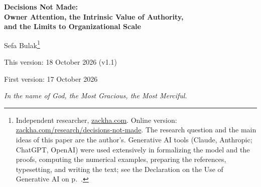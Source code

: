 \documentclass[11pt,a4paper]{article}
\theoremstyle{plain}
\begin{document}
\thispagestyle{plain}
\renewcommand{\thefootnote}{\fnsymbol{footnote}}
\begin{center}
  {\LARGE\bfseries Decisions Not Made:\\[0.35em]
    Owner Attention, the Intrinsic Value of Authority,\\[0.35em]
    and the Limits to Organizational Scale\par}
  \vspace{1.6em}
  {\large Sefa Bulak\footnote[1]{Independent researcher, \href{https://zackha.com}{zackha.com}. Online version: \href{https://zackha.com/research/decisions-not-made}{zackha.com/research/decisions-not-made}. The research question and the main ideas of this paper are the author's. Generative AI tools (Claude, Anthropic; ChatGPT, OpenAI) were used extensively in formalizing the model and the proofs, computing the numerical examples, preparing the references, typesetting, and writing the text; see the Declaration on the Use of Generative AI on p.~\pageref{sec:ai}.}\par}
  \vspace{1em}
  {\large This version: 18 October 2026 (v1.1)\par}
  \vspace{0.3em}
  {First version: 17 October 2026\par}
  \vspace{2em}
  {\itshape In the name of God, the Most Gracious, the Most Merciful.\par}
\end{center}
\vspace{1em}
\end{document}
